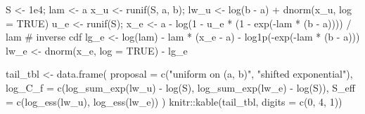 \documentclass[
  letterpaper,
  DIV=11,
  numbers=noendperiod]{scrreprt}
\newenvironment{Shaded}{\begin{snugshade}}{\end{snugshade}}
\newcommand{\AttributeTok}[1]{\textcolor[rgb]{0.40,0.45,0.13}{#1}}
\newcommand{\CommentTok}[1]{\textcolor[rgb]{0.37,0.37,0.37}{#1}}
\newcommand{\ConstantTok}[1]{\textcolor[rgb]{0.56,0.35,0.01}{#1}}
\newcommand{\DecValTok}[1]{\textcolor[rgb]{0.68,0.00,0.00}{#1}}
\newcommand{\FloatTok}[1]{\textcolor[rgb]{0.68,0.00,0.00}{#1}}
\newcommand{\FunctionTok}[1]{\textcolor[rgb]{0.28,0.35,0.67}{#1}}
\newcommand{\NormalTok}[1]{\textcolor[rgb]{0.00,0.23,0.31}{#1}}
\newcommand{\OtherTok}[1]{\textcolor[rgb]{0.00,0.23,0.31}{#1}}
\newcommand{\SpecialCharTok}[1]{\textcolor[rgb]{0.37,0.37,0.37}{#1}}
\newcommand{\StringTok}[1]{\textcolor[rgb]{0.13,0.47,0.30}{#1}}
\begin{document}
\begin{Shaded}
\begin{Highlighting}[]
\NormalTok{S }\OtherTok{\textless{}{-}} \FloatTok{1e4}\NormalTok{; lam }\OtherTok{\textless{}{-}}\NormalTok{ a}
\NormalTok{x\_u }\OtherTok{\textless{}{-}} \FunctionTok{runif}\NormalTok{(S, a, b);  lw\_u }\OtherTok{\textless{}{-}} \FunctionTok{log}\NormalTok{(b }\SpecialCharTok{{-}}\NormalTok{ a) }\SpecialCharTok{+} \FunctionTok{dnorm}\NormalTok{(x\_u, }\AttributeTok{log =} \ConstantTok{TRUE}\NormalTok{)}
\NormalTok{u\_e }\OtherTok{\textless{}{-}} \FunctionTok{runif}\NormalTok{(S); x\_e }\OtherTok{\textless{}{-}}\NormalTok{ a }\SpecialCharTok{{-}} \FunctionTok{log}\NormalTok{(}\DecValTok{1} \SpecialCharTok{{-}}\NormalTok{ u\_e }\SpecialCharTok{*}\NormalTok{ (}\DecValTok{1} \SpecialCharTok{{-}} \FunctionTok{exp}\NormalTok{(}\SpecialCharTok{{-}}\NormalTok{lam }\SpecialCharTok{*}\NormalTok{ (b }\SpecialCharTok{{-}}\NormalTok{ a)))) }\SpecialCharTok{/}\NormalTok{ lam        }\CommentTok{\# inverse cdf}
\NormalTok{lg\_e }\OtherTok{\textless{}{-}} \FunctionTok{log}\NormalTok{(lam) }\SpecialCharTok{{-}}\NormalTok{ lam }\SpecialCharTok{*}\NormalTok{ (x\_e }\SpecialCharTok{{-}}\NormalTok{ a) }\SpecialCharTok{{-}} \FunctionTok{log1p}\NormalTok{(}\SpecialCharTok{{-}}\FunctionTok{exp}\NormalTok{(}\SpecialCharTok{{-}}\NormalTok{lam }\SpecialCharTok{*}\NormalTok{ (b }\SpecialCharTok{{-}}\NormalTok{ a)))}
\NormalTok{lw\_e }\OtherTok{\textless{}{-}} \FunctionTok{dnorm}\NormalTok{(x\_e, }\AttributeTok{log =} \ConstantTok{TRUE}\NormalTok{) }\SpecialCharTok{{-}}\NormalTok{ lg\_e}

\NormalTok{tail\_tbl }\OtherTok{\textless{}{-}} \FunctionTok{data.frame}\NormalTok{(}
    \AttributeTok{proposal   =} \FunctionTok{c}\NormalTok{(}\StringTok{"uniform on (a, b)"}\NormalTok{, }\StringTok{"shifted exponential"}\NormalTok{),}
    \AttributeTok{log\_C\_f    =} \FunctionTok{c}\NormalTok{(}\FunctionTok{log\_sum\_exp}\NormalTok{(lw\_u) }\SpecialCharTok{{-}} \FunctionTok{log}\NormalTok{(S), }\FunctionTok{log\_sum\_exp}\NormalTok{(lw\_e) }\SpecialCharTok{{-}} \FunctionTok{log}\NormalTok{(S)),}
    \AttributeTok{S\_eff      =} \FunctionTok{c}\NormalTok{(}\FunctionTok{log\_ess}\NormalTok{(lw\_u), }\FunctionTok{log\_ess}\NormalTok{(lw\_e))}
\NormalTok{)}
\NormalTok{knitr}\SpecialCharTok{::}\FunctionTok{kable}\NormalTok{(tail\_tbl, }\AttributeTok{digits =} \FunctionTok{c}\NormalTok{(}\DecValTok{0}\NormalTok{, }\DecValTok{4}\NormalTok{, }\DecValTok{1}\NormalTok{))}
\end{Highlighting}
\end{Shaded}
\end{document}
